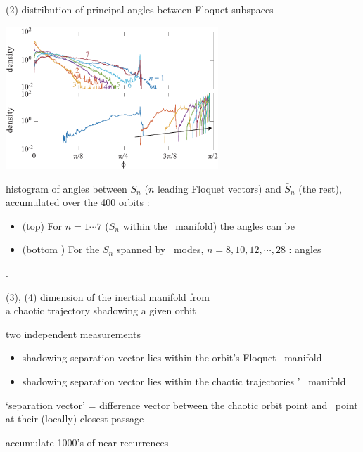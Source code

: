 \begin{frame}{(2) distribution of principal angles between Floquet subspaces}
\begin{center}
\includegraphics[width=0.6\textwidth]{../../dimension/ks22vecAngles}
\end{center}


histogram of angles between $S_n$
($n$ leading Floquet vectors) and $\bar{S}_n$
(the rest),
accumulated over the 400 orbits :
\begin{itemize}
  \item
(top) For
$n=1 \cdots 7$ ($S_n$ within the \entangled\ manifold) the angles can be
{\color{red}{arbitrarily small}}
  \item
(bottom ) For the $\bar{S}_n$ spanned by \transient\
modes,
$n=8,10,12,\cdots,28$ :
angles {\color{red}{bounded away from unity}}
\end{itemize}
.
\end{frame}

\begin{frame}{(3), (4) dimension of the inertial manifold from \\
        a chaotic trajectory shadowing a given orbit}

\bigskip

two independent measurements

\begin{itemize}
  \item[(3)] shadowing separation vector lies within the orbit's Floquet \entangled\ manifold
  \item[(4)]  shadowing separation vector lies within the chaotic trajectories \cLvs' \entangled\ manifold
\end{itemize}

\bigskip

`separation vector' = difference vector between the chaotic orbit point and
\po\ point at their (locally) closest passage

\medskip

accumulate 1000's of near recurrences


\end{frame}


